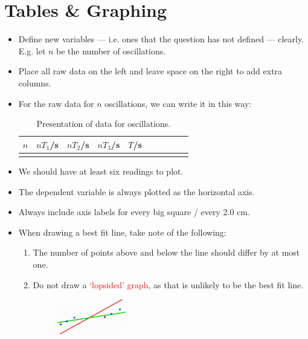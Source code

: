 \documentclass[oneside]{book}
\begin{document}
\section{Tables \& Graphing}
\begin{itemize}
    \item Define new variables --- i.e. ones that the question has not defined --- clearly. E.g. let \(n\) be the number of oscillations.
    \item Place all raw data on the left and leave space on the right to add extra columns.
    \item For the raw data for \(n\) oscillations, we can write it in this way:
    \begin{table}[H]
        \centering
        \begin{tabular}{|Sc|Sc|Sc|Sc|Sc|}
            \hline
            \(n\) & \(nT_1\)/s & \(nT_2\)/s & \(nT_3\)/s & \(T\)/s\\
            \hline
            &&&&\\
            \hline
        \end{tabular}
        \caption{Presentation of data for oscillations.}
        \label{table:raw-data-for-n-oscillations}
    \end{table} 
    \item We should have at least six readings to plot.
    \item The dependent variable is always plotted as the horizontal axis.
    \item Always include axis labels for every big square / every 2.0 cm.
    \item When drawing a best fit line, take note of the following:
    \begin{enumerate}
        \item The number of points above and below the line should differ by at most one.
        \item Do not draw a \textcolor{red}{`lopsided' graph}, as that is unlikely to be the \textcolor{green!70!black}{best fit line}.
        \begin{figure}[H]
            \centering
            \includegraphics[width=0.3\textwidth]{../images/lopsided-best-fit-line.jpg}

\end{figure}
\end{enumerate}
\end{itemize}
\end{document}
